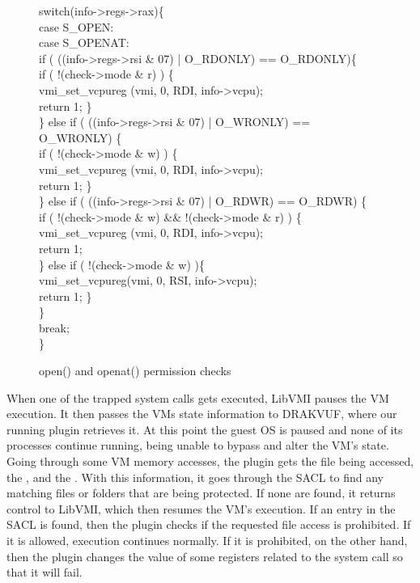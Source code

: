 \begin{figure}[ht!]
\footnotesize {
	{\selectfont 
\tab switch(info->regs->rax)\{\\
\tab \tab case S\_OPEN:\\
\tab \tab case S\_OPENAT:\\
\tab \tab if ( ((info->regs->rsi \& 07) | O\_RDONLY) == O\_RDONLY)\{\\
\tab \tab \tab if ( !(check->mode \& r) ) \{\\
\tab \tab \tab \tab vmi\_set\_vcpureg (vmi, 0, RDI, info->vcpu);\\
\tab \tab \tab \tab return 1; \}\\
\tab \tab \} else if ( ((info->regs->rsi \& 07) | O\_WRONLY) == O\_WRONLY) \{\\
\tab \tab \tab if ( !(check->mode \& w) ) \{\\
\tab \tab \tab \tab vmi\_set\_vcpureg (vmi, 0, RDI, info->vcpu);\\
\tab \tab \tab \tab return 1; \}\\
\tab \tab \} else if ( ((info->regs->rsi \& 07) | O\_RDWR) == O\_RDWR) \{\\
\tab \tab \tab if ( !(check->mode \& w) \&\& !(check->mode \& r) ) \{\\
\tab \tab \tab \tab vmi\_set\_vcpureg (vmi, 0, RDI, info->vcpu);\\
\tab \tab \tab \tab return 1;\\
\tab \tab \tab \} else if ( !(check->mode \& w) )\{\\
\tab \tab \tab \tab vmi\_set\_vcpureg(vmi, 0, RSI, info->vcpu);\\
\tab \tab \tab \tab return 1; \}\\
\tab \tab \}\\
\tab \tab break;\\
\tab \}\\
}}
	\caption{open() and openat() permission checks}
	\label{fig:open}
\end{figure}

\par When one of the trapped system calls gets executed, LibVMI pauses the \ac{VM} execution. It then passes the \ac{VM}s state information to DRAKVUF, where our running plugin retrieves it. At this point the guest \ac{OS} is paused and none of its processes continue running, being unable to bypass and alter the \ac{VM}'s state. Going through some \ac{VM} memory accesses, the plugin gets the file being accessed, the , and the . With this information, it goes through the \ac{SACL} to find any matching files or folders that are being protected. If none are found, it returns control to LibVMI, which then resumes the \ac{VM}'s execution. If an entry in the \ac{SACL} is found, then the plugin checks if the requested file access is prohibited. If it is allowed, execution continues normally. If it is prohibited, on the other hand, then the plugin changes the value of some registers related to the system call so that it will fail.


